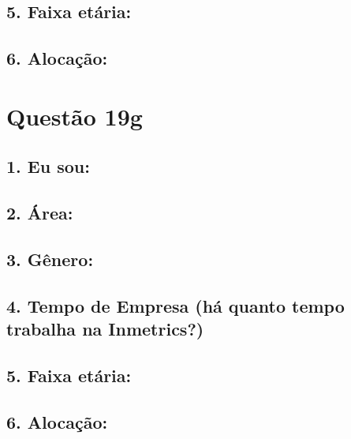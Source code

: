 \documentclass[]{book}
\begin{document}
\hypertarget{faixa-etaria-50}{%
\subsection{5. Faixa etária:}\label{faixa-etaria-50}}

\hypertarget{alocacao-50}{%
\subsection{6. Alocação:}\label{alocacao-50}}

\hypertarget{questao-19g}{%
\section{Questão 19g}\label{questao-19g}}

\hypertarget{eu-sou-51}{%
\subsection{1. Eu sou:}\label{eu-sou-51}}

\hypertarget{area-51}{%
\subsection{2. Área:}\label{area-51}}

\hypertarget{genero-51}{%
\subsection{3. Gênero:}\label{genero-51}}

\hypertarget{tempo-de-empresa-ha-quanto-tempo-trabalha-na-inmetrics-51}{%
\subsection{4. Tempo de Empresa (há quanto tempo trabalha na Inmetrics?)}\label{tempo-de-empresa-ha-quanto-tempo-trabalha-na-inmetrics-51}}

\hypertarget{faixa-etaria-51}{%
\subsection{5. Faixa etária:}\label{faixa-etaria-51}}

\hypertarget{alocacao-51}{%
\subsection{6. Alocação:}\label{alocacao-51}}
\end{document}
